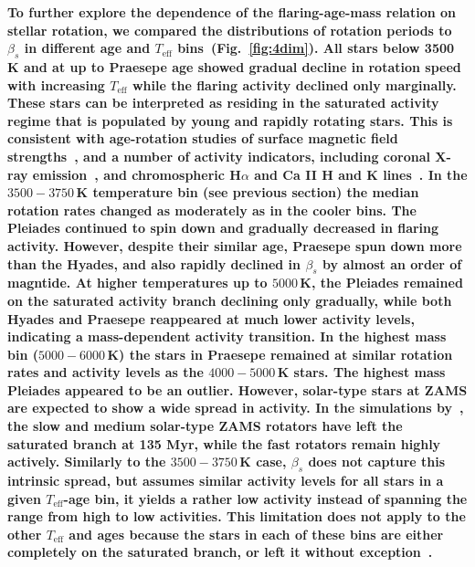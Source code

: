 \documentclass{aa}
\begin{document}
\textbf{To further explore the dependence of the flaring-age-mass relation on stellar rotation, we compared the distributions of rotation periods to $\beta_s$ in different age and $T_\mathrm{eff}$ bins~(Fig.~\ref{fig:4dim}). All stars below 3500 K and at up to Praesepe age showed gradual decline in rotation speed with increasing $T_\mathrm{eff}$ while the flaring activity declined only marginally. These stars can be interpreted as residing in the saturated activity regime that is populated by young and rapidly rotating stars. This is consistent with age-rotation studies of surface magnetic field strengths~\citep{vidotto2014}, and a number of activity indicators, including coronal X-ray emission~\citep{pizzolato2003,wright2011}, and chromospheric H$\alpha$ and Ca II H and K lines~\citep{mamajek2008,west2015,newton2017}. In the $3500-3750$\,K temperature bin (see previous section) the median rotation rates changed as moderately as in the cooler bins. The Pleiades continued to spin down and gradually decreased in flaring activity. However, despite their similar age, Praesepe spun down more than the Hyades, and also rapidly declined in $\beta_s$ by almost an order of magntide. At higher temperatures up to $5000$\,K, the Pleiades remained on the saturated activity branch declining only gradually, while both Hyades and Praesepe reappeared at much lower activity levels, indicating a mass-dependent activity transition. In the highest mass bin ($5000-6000$\,K) the stars in Praesepe remained at similar rotation rates and activity levels as the $4000-5000$\,K stars. The highest mass Pleiades appeared to be an outlier. However, solar-type stars at ZAMS are expected to show a wide spread in activity. In the simulations by~\citet{johnstone2020}, the slow and medium solar-type ZAMS rotators have left the saturated branch at 135 Myr, while the fast rotators remain highly actively. Similarly to the $3500-3750$\,K case, $\beta_s$ does not capture this intrinsic spread, but assumes similar activity levels for all stars in a given $T_\mathrm{eff}$-age bin, it yields a rather low activity instead of spanning the range from high to low activities. This limitation does not apply to the other $T_\mathrm{eff}$ and ages because the stars in each of these bins are either completely on the saturated branch, or left it without exception~\citep{johnstone2020}.}
\end{document}
